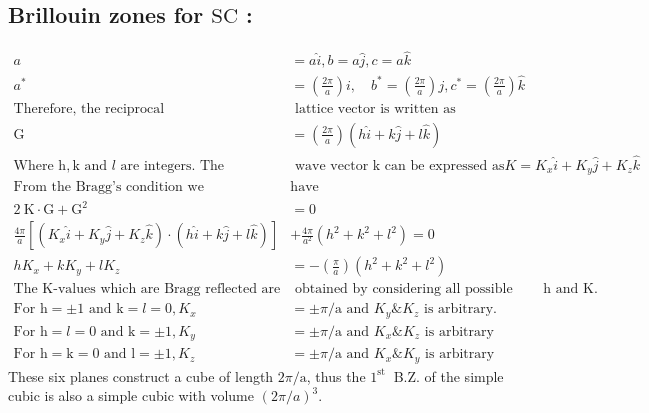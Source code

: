 \subsection{Brillouin zones for $\mathrm{SC}$ :}
\begin{align*}
a&=a \hat{i}, b=a \hat{j}, c=a \hat{k}\\
a^{*}&=\left(\frac{2 \pi}{a}\right) i, \quad b^{*}=\left(\frac{2 \pi}{a}\right) j, c^{*}=\left(\frac{2 \pi}{a}\right) \hat{k}\\
\text{Therefore, the reciprocal}&\text{ lattice vector is written as}\\
\mathrm{G}&=\left(\frac{2 \pi}{a}\right)(h \hat{i}+k \hat{j}+l \hat{k})\\
\text{Where $\mathrm{h}, \mathrm{k}$ and $l$ are integers. The }&\text{ wave vector $\mathrm{k}$ can be expressed as}
K=K_{x} \hat{i}+K_{y} \hat{j}+K_{z} \hat{k}\\
\text{From the Bragg's condition we }&\text{have} \\
2 \mathrm{~K} \cdot \mathrm{G}+\mathrm{G}^{2}&=0\\
\frac{4 \pi}{a}\left[\left(K_{x} \hat{i}+K_{y} \hat{j}+K_{z} \hat{k}\right) \cdot(h \hat{i}+k \hat{j}+l \hat{k})\right]&+\frac{4 \pi}{a^{2}}\left(h^{2}+k^{2}+l^{2}\right)=0\\
h K_{x}+k K_{y}+l K_{z}&=-\left(\frac{\pi}{a}\right)\left(h^{2}+k^{2}+l^{2}\right)\\
\text{The $\mathrm{K}$-values which are Bragg reflected are}&\text{ obtained by considering all possible combination of $\mathrm{h}$ and $\mathrm{K}$.}\\
\text{For $\mathrm{h}=\pm 1$ and $\mathrm{k}=l=0, K_{x}$}&\text{$=\pm \pi / \mathrm{a}$ and $K_{y} \& K_{z}$ is arbitrary.}\\
\text{For $\mathrm{h}=l=0$ and $\mathrm{k}=\pm 1, K_{y}$}&\text{$=\pm \pi / \mathrm{a}$ and $K_{x} \& K_{z}$ is arbitrary}\\
\text{For $\mathrm{h}=\mathrm{k}=0$ and $\mathrm{l}=\pm 1, K_{z}$}&\text{$=\pm \pi / \mathrm{a}$ and $K_{x} \& K_{y}$ is arbitrary}
\end{align*}
These six planes construct a cube of length $2 \pi / \mathrm{a}$, thus the $1^{\text {st }}$ B.Z. of the simple cubic is also a simple cubic with volume $(2 \pi / a)^{3}$. 
